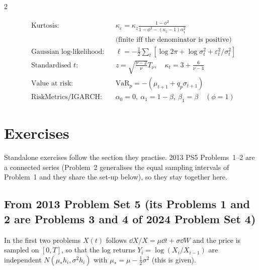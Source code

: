 \begin{paracol}{2}
\begin{keyformulas}
\begin{align*}
&\text{Kurtosis:} && \kappa_\varepsilon=\kappa_z\tfrac{1-\phi^2}{1-\phi^2-(\kappa_z-1)\alpha_1^2}\\
& && \text{(finite iff the denominator is positive)}\\
&\text{Gaussian log-likelihood:} && \ell=-\tfrac12\textstyle\sum_t[\log2\pi+\log\sigma_t^2+\varepsilon_t^2/\sigma_t^2]\\
&\text{Standardised $t$:} && z=\sqrt{\tfrac{\nu-2}{\nu}}T_\nu,\quad\kappa_t=3+\tfrac6{\nu-4}\\
&\text{Value at risk:} && \mathrm{VaR}_p=-(\mu_{t+1}+q_p\sigma_{t+1})\\
&\text{RiskMetrics/IGARCH:} && \alpha_0=0,\ \alpha_1=1-\beta,\ \beta_1=\beta\quad(\phi=1)
\end{align*}
\end{keyformulas}

\section*{Exercises}
Standalone exercises follow the section they practise. 2013 PS5 Problems~1--2 are a connected series (Problem~2 generalises the equal sampling intervals of Problem~1 and they share the set-up below), so they stay together here.

\subsection*{From 2013 Problem Set 5 (its Problems 1 and 2 are Problems 3 and 4 of 2024 Problem Set 4)}
In the first two problems $X(t)$ follows $\dd X/X=\mu\dd t+\sigma\dd W$ and the price is sampled on $[0,T]$, so that the log returns $Y_i=\log(X_i/X_{i-1})$ are independent $N(\mu_*h_i,\sigma^2h_i)$ with $\mu_*=\mu-\tfrac12\sigma^2$ (this is given).


\end{paracol}
